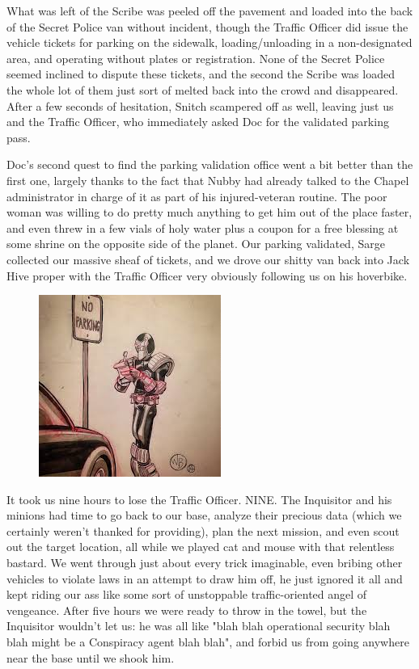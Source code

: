 What was left of the Scribe was peeled off the pavement and loaded into the back of the Secret Police van without incident, though the Traffic Officer did issue the vehicle tickets for parking on the sidewalk, loading/unloading in a non-designated area, and operating without plates or registration. 
None of the Secret Police seemed inclined to dispute these tickets, and the second the Scribe was loaded the whole lot of them just sort of melted back into the crowd and disappeared. 
After a few seconds of hesitation, Snitch scampered off as well, leaving just us and the Traffic Officer, who immediately asked Doc for the validated parking pass.

Doc's second quest to find the parking validation office went a bit better than the first one, largely thanks to the fact that Nubby had already talked to the Chapel administrator in charge of it as part of his injured-veteran routine. 
The poor woman was willing to do pretty much anything to get him out of the place faster, and even threw in a few vials of holy water plus a coupon for a free blessing at some shrine on the opposite side of the planet. 
Our parking validated, Sarge collected our massive sheaf of tickets, and we drove our shitty van back into Jack Hive proper with the Traffic Officer very obviously following us on his hoverbike.

\begin{figure}
	\begin{center}
		\includegraphics[width=\figwidth]{pics/17/55.png}
	\end{center}
\end{figure}
It took us nine hours to lose the Traffic Officer. 
NINE. 
The Inquisitor and his minions had time to go back to our base, analyze their precious data (which we certainly weren't thanked for providing), plan the next mission, and even scout out the target location, all while we played cat and mouse with that relentless bastard. 
We went through just about every trick imaginable, even bribing other vehicles to violate laws in an attempt to draw him off, he just ignored it all and kept riding our ass like some sort of unstoppable traffic-oriented angel of vengeance. 
After five hours we were ready to throw in the towel, but the Inquisitor wouldn't let us: 
he was all like "blah blah operational security blah blah might be a Conspiracy agent blah blah", and forbid us from going anywhere near the base until we shook him.

